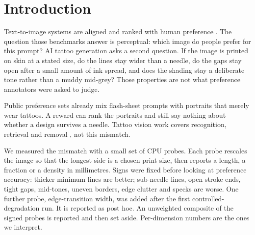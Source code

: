 \section{Introduction}
\label{sec:intro}

Text-to-image systems are aligned and ranked with human preference \citep{rombach2022ldm,wu2023hps,wu2023hpsv2,xu2023imagereward,kirstain2023pickapic,wallace2024diffusiondpo,fan2023dpok}.
The question those benchmarks answer is perceptual: which image do people prefer for this prompt?
AI tattoo generation asks a second question.
If the image is printed on skin at a stated size, do the lines stay wider than a needle, do the gaps stay open after a small amount of ink spread, and does the shading stay a deliberate tone rather than a muddy mid-grey?
Those properties are not what preference annotators were asked to judge.

Public preference sets already mix flash-sheet prompts with portraits that merely wear tattoos.
A reward can rank the portraits and still say nothing about whether a design survives a needle.
Tattoo vision work covers recognition, retrieval and removal \citep{nist2016tattbp,gonzalezsoler2024tatttrn,genink2025,ibsen2022facebeneath}, not this mismatch.

We measured the mismatch with a small set of CPU probes.
Each probe rescales the image so that the longest side is a chosen print size, then reports a length, a fraction or a density in millimetres.
Signs were fixed before looking at preference accuracy: thicker minimum lines are better; sub-needle lines, open stroke ends, tight gaps, mid-tones, uneven borders, edge clutter and specks are worse.
One further probe, edge-transition width, was added after the first controlled-degradation run.
It is reported as post hoc.
An unweighted composite of the signed probes is reported and then set aside.
Per-dimension numbers are the ones we interpret.

